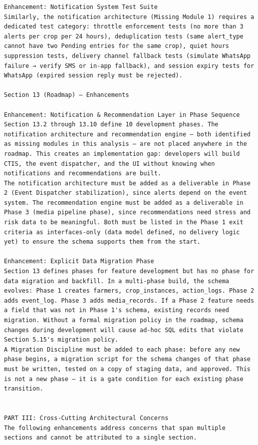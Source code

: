 \documentclass{article}
\begin{document}
\begin{verbatim}
Enhancement: Notification System Test Suite
Similarly, the notification architecture (Missing Module 1) requires a dedicated test category: throttle enforcement tests (no more than 3 alerts per crop per 24 hours), deduplication tests (same alert_type cannot have two Pending entries for the same crop), quiet hours suppression tests, delivery channel fallback tests (simulate WhatsApp failure → verify SMS or in-app fallback), and session expiry tests for WhatsApp (expired session reply must be rejected).

Section 13 (Roadmap) — Enhancements

Enhancement: Notification & Recommendation Layer in Phase Sequence
Section 13.2 through 13.10 define 10 development phases. The notification architecture and recommendation engine — both identified as missing modules in this analysis — are not placed anywhere in the roadmap. This creates an implementation gap: developers will build CTIS, the event dispatcher, and the UI without knowing when notifications and recommendations are built.
The notification architecture must be added as a deliverable in Phase 2 (Event Dispatcher stabilization), since alerts depend on the event system. The recommendation engine must be added as a deliverable in Phase 3 (media pipeline phase), since recommendations need stress and risk data to be meaningful. Both must be listed in the Phase 1 exit criteria as interfaces-only (data model defined, no delivery logic yet) to ensure the schema supports them from the start.

Enhancement: Explicit Data Migration Phase
Section 13 defines phases for feature development but has no phase for data migration and backfill. In a multi-phase build, the schema evolves: Phase 1 creates farmers, crop_instances, action_logs. Phase 2 adds event_log. Phase 3 adds media_records. If a Phase 2 feature needs a field that was not in Phase 1's schema, existing records need migration. Without a formal migration policy in the roadmap, schema changes during development will cause ad-hoc SQL edits that violate Section 5.15's migration policy.
A Migration Discipline must be added to each phase: before any new phase begins, a migration script for the schema changes of that phase must be written, tested on a copy of staging data, and approved. This is not a new phase — it is a gate condition for each existing phase transition.


PART III: Cross-Cutting Architectural Concerns
The following enhancements address concerns that span multiple sections and cannot be attributed to a single section.


\end{verbatim}
\end{document}
